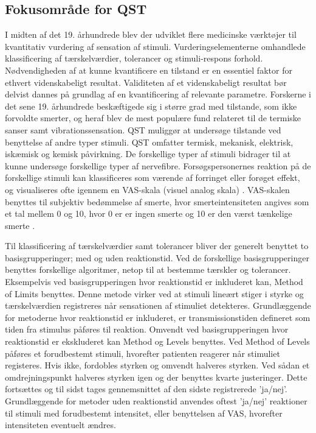 \subsection{Fokusområde for QST}
I midten af det 19. århundrede blev der udviklet flere medicinske værktøjer til kvantitativ vurdering af sensation af stimuli. Vurderingselementerne omhandlede klassificering af tærskelværdier, tolerancer og stimuli-respons forhold. Nødvendigheden af at kunne kvantificere en tilstand er en essentiel faktor for ethvert videnskabeligt resultat. Validiteten af et videnskabeligt resultat bør  delvist dannes på grundlag af en kvantificering af relevante parametre. \citep{Yarnitsky1997} \citep{Yarnitsky2006} Forskerne i det sene 19. århundrede beskæftigede sig i større grad med tilstande, som ikke forvoldte smerter, og heraf blev de mest populære fund relateret til de termiske sanser samt vibrationssensation. \citep{Yarnitsky1997} QST muliggør at undersøge tilstande ved benyttelse af andre typer stimuli. QST omfatter termisk, mekanisk, elektrisk, iskæmisk og kemisk påvirkning. \citep{Yarnitsky2006} De forskellige typer af stimuli bidrager til at kunne undersøge forskellige typer af nervefibre. Forsøgspersonernes reaktion på de forskellige stimuli kan klassificeres som værende af forringet eller forøget effekt, og visualiseres ofte igennem en VAS-skala (visuel analog skala) \citep{Yarnitsky2006}. VAS-skalen benyttes til subjektiv bedømmelse af smerte, hvor smerteintensiteten angives som et tal mellem 0 og 10, hvor 0 er er ingen smerte og 10 er den værst tænkelige smerte \citep{smerter}. 


Til klassificering af tærskelværdier samt tolerancer bliver der generelt benyttet to basisgrupperinger; med og uden reaktionstid. Ved de forskellige basisgrupperinger benyttes forskellige algoritmer, netop til at bestemme tærskler og tolerancer. Eksempelvis ved basisgrupperingen hvor reaktionstid er inkluderet kan, Method of Limits benyttes. Denne metode virker ved at stimuli lineært stiger i styrke og tærskelværdien registreres når sensationen af stimuliet detekteres. Grundlæggende for metoderne hvor reaktionstid er inkluderet, er transmissionstiden defineret som tiden fra stimulus påføres til reaktion. Omvendt ved basisgrupperingen hvor reaktionstid er ekskluderet kan Method og Levels benyttes. Ved Method of Levels påføres et forudbestemt stimuli, hvorefter patienten reagerer når stimuliet registeres. Hvis ikke, fordobles styrken og omvendt halveres styrken. Ved sådan et omdrejningspunkt halveres styrken igen og der benyttes kvarte justeringer. Dette fortsættes og til sidst tages gennemsnittet af den sidste registrerede 'ja/nej'. Grundlæggende for metoder uden reaktionstid anvendes oftest 'ja/nej' reaktioner til stimuli med forudbestemt intensitet, eller benyttelsen af VAS, hvorefter intensiteten eventuelt ændres. \citep{Yarnitsky1997} \citep{Yarnitsky2006} 

